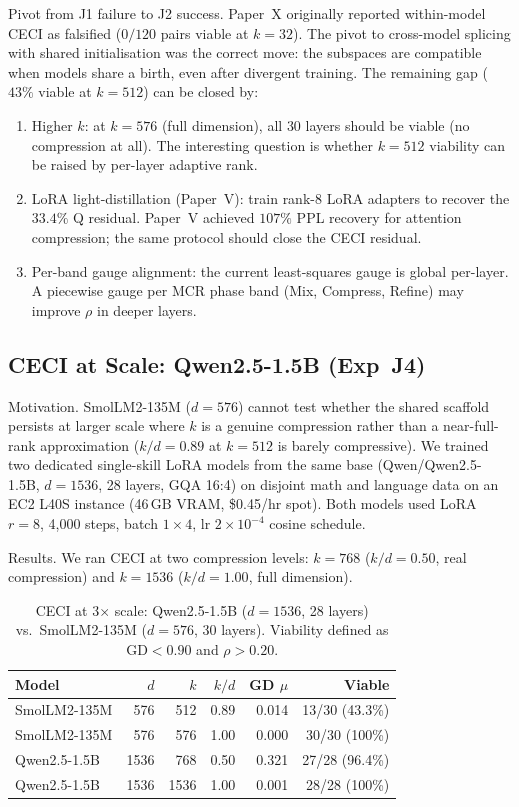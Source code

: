 \documentclass[11pt]{article}
\begin{document}
Pivot from J1 failure to J2 success.  Paper~X originally reported
within-model CECI as falsified ($0/120$ pairs viable at $k{=}32$).  The
pivot to cross-model splicing with shared initialisation was the correct
move: the subspaces are compatible when models share a birth, even
after divergent training.  The remaining gap ($43\%$ viable at $k{=}512$)
can be closed by:
\begin{enumerate}
\item Higher $k$: at $k{=}576$ (full dimension), all $30$ layers
      should be viable (no compression at all).  The interesting question is
      whether $k{=}512$ viability can be raised by per-layer adaptive rank.
\item LoRA light-distillation (Paper~V): train rank-$8$ LoRA
      adapters to recover the $33.4\%$ Q residual.  Paper~V achieved
      $107\%$ PPL recovery for attention compression; the same protocol
      should close the CECI residual.
\item Per-band gauge alignment: the current least-squares gauge is
      global per-layer.  A piecewise gauge per MCR phase band (Mix,
      Compress, Refine) may improve $\rho$ in deeper layers.
\end{enumerate}

\subsection{CECI at Scale: Qwen2.5-1.5B (Exp~J4)}
\label{sec:j4-qwen}

Motivation.  SmolLM2-135M ($d{=}576$) cannot test whether the
shared scaffold persists at larger scale where $k$ is a genuine compression
rather than a near-full-rank approximation ($k/d{=}0.89$ at $k{=}512$ is
barely compressive).  We trained two dedicated single-skill LoRA models from
the same base (Qwen/Qwen2.5-1.5B, $d{=}1536$, 28 layers, GQA 16:4) on
disjoint math and language data on an EC2 L40S instance (46\,GB VRAM,
\$0.45/hr spot).  Both models used LoRA $r{=}8$, 4,000 steps, batch
$1{\times}4$, lr $2{\times}10^{-4}$ cosine schedule.

Results.  We ran CECI at two compression levels:
$k{=}768$ ($k/d{=}0.50$, real compression) and $k{=}1536$ ($k/d{=}1.00$,
full dimension).

\begin{table}[h]\centering\small
\caption{CECI at 3$\times$ scale: Qwen2.5-1.5B ($d{=}1536$, 28 layers)
vs.\ SmolLM2-135M ($d{=}576$, 30 layers).  Viability defined as
$\mathrm{GD}<0.90$ and $\rho>0.20$.}
\label{tab:j4-qwen}
\begin{tabular}{@{}lrrrrr@{}}
\toprule
Model & $d$ & $k$ & $k/d$ & GD $\mu$ & Viable \\
\midrule
SmolLM2-135M & 576  & 512  & 0.89 & 0.014 & 13/30 (43.3\%) \\
SmolLM2-135M & 576  & 576  & 1.00 & 0.000 & 30/30 (100\%) \\
Qwen2.5-1.5B & 1536 & 768 & 0.50 & 0.321 & 27/28 (96.4\%) \\
Qwen2.5-1.5B & 1536 & 1536 & 1.00 & 0.001 & 28/28 (100\%) \\
\bottomrule
\end{tabular}
\end{table}
\end{document}
